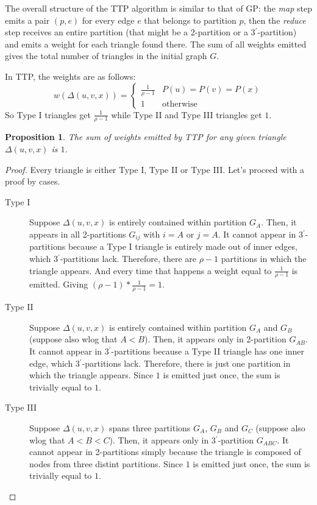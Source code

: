\documentclass[paper=a4, fontsize=11pt]{scrartcl}
\newtheorem{proposition}{Proposition}
\numberwithin{equation}{section}
\numberwithin{figure}{section}
\numberwithin{table}{section}
\begin{document}
The overall structure of the TTP algorithm is similar to that of GP: the
\emph{map} step emits a pair $(p, e)$ for every edge $e$ that belongs to
partition $p$, then the \emph{reduce} step receives an entire partition (that
might be a 2-partition or a 3$^\prime$-partition) and emits a weight for each
triangle found there. The sum of all weights emitted gives the total number of
triangles in the initial graph $G$.

In TTP, the weights are as follows:
\[
    w(\Delta(u,v,x)) = \begin{cases}
        \frac{1}{\rho-1} & P(u) = P(v) = P(x)  \\
        1 & \text{otherwise}
    \end{cases}
\]
So Type I triangles get $\frac{1}{\rho-1}$ while Type II and Type III triangles
get $1$.

\begin{proposition}
    The sum of weights emitted by TTP for any given triangle $\Delta(u, v, x)$ is $1$.
\end{proposition}
\begin{proof}
    Every triangle is either Type I, Type II or Type III. Let's proceed with a
    proof by cases.
    \begin{description}
        \item[Type I] Suppose $\Delta(u, v, x)$ is entirely contained within
        partition $G_A$. Then, it appears in all 2-partitions $G_{ij}$ with
        $i=A$ or $j=A$. It cannot appear in 3$^\prime$-partitions because a Type
        I triangle is entirely made out of inner edges, which
        3$^\prime$-partitions lack. Therefore, there are $\rho-1$ partitions in
        which the triangle appears. And every time that happens a weight equal
        to $\frac{1}{\rho-1}$ is emitted. Giving $(\rho-1)*\frac{1}{\rho-1}=1$.

        \item[Type II] Suppose $\Delta(u, v, x)$ is entirely contained within
        partition $G_A$ and $G_B$ (suppose also wlog that $A<B$). Then, it
        appears only in 2-partition $G_{AB}$. It cannot appear in
        3$^\prime$-partitions because a Type II triangle has one inner edge,
        which 3$^\prime$-partitions lack. Therefore, there is just one partition
        in which the triangle appears. Since $1$ is emitted just once, the sum
        is trivially equal to $1$.

        \item[Type III] Suppose $\Delta(u, v, x)$ spans three partitions $G_A$,
        $G_B$ and $G_C$ (suppose also wlog that $A<B<C$). Then, it appears only
        in 3$^\prime$-partition $G_{ABC}$. It cannot appear in 2-partitions
        simply because the triangle is composed of nodes from three distint
        partitions. Since $1$ is emitted just once, the sum is trivially equal
        to $1$.
    \end{description}
\end{proof}
\end{document}
